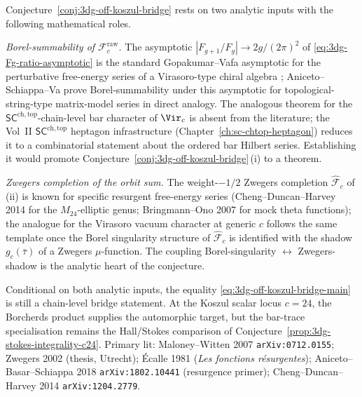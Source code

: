 \begin{remark}
\label{rem:3dg-off-koszul-analytic-inputs}
%
%
Conjecture~\ref{conj:3dg-off-koszul-bridge} rests on two analytic
inputs with the following mathematical roles.

\emph{Borel-summability of $\mathcal F^{\mathrm{raw}}_{c}$.} The
asymptotic $|F_{g+1}/F_{g}| \to 2g/(2\pi)^{2}$ of
\eqref{eq:3dg-Fg-ratio-asymptotic} is the standard Gopakumar--Vafa
asymptotic for the perturbative free-energy series of a Virasoro-type
chiral algebra \cite{GopakumarVafa1998}; Aniceto--Schiappa--Va
\cite{AnicetoSchiappa2015} prove Borel-summability under this
asymptotic for topological-string-type matrix-model series in
direct analogy. The analogous theorem for the
$\mathsf{SC}^{\mathrm{ch,top}}$-chain-level bar character of
$\Vir_{c}$ is absent from the literature; the Vol~II
$\mathsf{SC}^{\mathrm{ch,top}}$ heptagon infrastructure
(Chapter~\ref{ch:sc-chtop-heptagon}) reduces it to a combinatorial
statement about the ordered bar Hilbert series. Establishing it
would promote
Conjecture~\ref{conj:3dg-off-koszul-bridge}\,\textup{(i)} to a
theorem.

\emph{Zwegers completion of the orbit sum.} The weight-$-1/2$
Zwegers completion $\widehat{\mathcal F}_{c}$ of
\textup{(ii)} is known for specific resurgent free-energy series
(Cheng--Duncan--Harvey 2014 for the $M_{24}$-elliptic genus;
Bringmann--Ono 2007 for mock theta functions); the analogue for the
Virasoro vacuum character at generic $c$ follows the same template
once the Borel singularity structure of $\widehat{\mathcal F}_{c}$
is identified with the shadow $g_{c}(\bar\tau)$ of a Zwegers
$\mu$-function. The coupling Borel-singularity $\leftrightarrow$
Zwegers-shadow is the analytic heart of the conjecture.

Conditional on both analytic inputs, the equality
\eqref{eq:3dg-off-koszul-bridge-main} is still a chain-level bridge
statement. At the Koszul scalar locus \(c=24\), the Borcherds
product supplies the automorphic target, but the bar-trace
specialisation remains the Hall/Stokes comparison of
Conjecture~\ref{prop:3dg-stokes-integrality-c24}. Primary lit:
Maloney--Witten 2007 \texttt{arXiv:0712.0155}; Zwegers 2002
(thesis, Utrecht); \'Ecalle 1981 (\emph{Les fonctions r\'esurgentes});
Aniceto--Basar--Schiappa 2018 \texttt{arXiv:1802.10441} (resurgence
primer); Cheng--Duncan--Harvey 2014 \texttt{arXiv:1204.2779}.
\end{remark}

